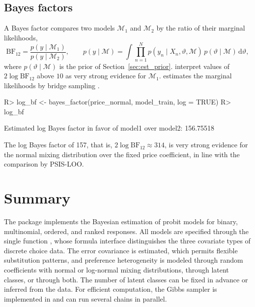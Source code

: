 \documentclass[article,shortnames]{jss}
\newcommand{\fct}[1]{\code{#1()}}
\begin{document}
\subsection{Bayes factors} \label{sec:bayes_factors}

A Bayes factor compares two models $\mathcal{M}_1$ and $\mathcal{M}_2$ by the
ratio of their marginal likelihoods,
%
\begin{equation}
\label{eq:bayes_factor}
\mathrm{BF}_{12} = \frac{p(y \mid \mathcal{M}_1)}{p(y \mid \mathcal{M}_2)},
\qquad
p(y \mid \mathcal{M}) = \int \prod_{n = 1}^{N} p(y_n \mid X_n, \vartheta,
\mathcal{M})\, p(\vartheta \mid \mathcal{M})\, \mathrm{d}\vartheta,
\end{equation}
%
where $p(\vartheta \mid \mathcal{M})$ is the prior of
Section~\ref{sec:est_prior}. \citet{Kass1995} interpret values of
$2 \log \mathrm{BF}_{12}$ above $10$ as very strong evidence for
$\mathcal{M}_1$. \fct{bayes\_factor} estimates the marginal likelihoods by
bridge sampling \citep{Meng1996, FruehwirthSchnatter2004, Gronau2017}.
%
\begin{Schunk}
\begin{Sinput}
R> log_bf <- bayes_factor(price_normal, model_train, log = TRUE)
R> log_bf
\end{Sinput}
\begin{Soutput}
Estimated log Bayes factor in favor of model1 over model2: 156.75518
\end{Soutput}
\end{Schunk}
%
The log Bayes factor of 157, that is, $2 \log
\mathrm{BF}_{12} \approx 314$, is very strong evidence
for the normal mixing distribution over the fixed price coefficient, in line
with the comparison by PSIS-LOO.

\section{Summary} \label{sec:summary}

The  package  implements the Bayesian estimation of
probit models for binary, multinomial, ordered, and ranked responses. All models
are specified through the single function \fct{fit}, whose formula interface
distinguishes the three covariate types of discrete choice data. The error
covariance is estimated, which permits flexible substitution patterns, and
preference heterogeneity is modeled through random coefficients with normal or
log-normal mixing distributions, through latent classes, or through both. The
number of latent classes can be fixed in advance or inferred from the data. For
efficient computation, the Gibbs sampler is implemented in  and
can run several chains in parallel.
\end{document}
